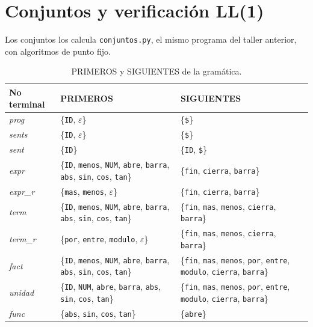 \documentclass[12pt,letterpaper]{article}
\newcommand{\tk}[1]{\texttt{#1}}
\begin{document}
\section{Conjuntos y verificación LL(1)}

Los conjuntos los calcula \tk{conjuntos.py}, el mismo programa del taller anterior, con algoritmos de punto fijo.

\begin{table}[H]
\centering
\caption{PRIMEROS y SIGUIENTES de la gramática.}
\footnotesize
\begin{tabular}{l p{5.0cm} p{5.4cm}}
\toprule
No terminal & PRIMEROS & SIGUIENTES \\
\midrule
\textit{prog} & \{\texttt{ID}, $\varepsilon$\} & \{\texttt{\$}\} \\
\textit{sents} & \{\texttt{ID}, $\varepsilon$\} & \{\texttt{\$}\} \\
\textit{sent} & \{\texttt{ID}\} & \{\texttt{ID}, \texttt{\$}\} \\
\textit{expr} & \{\texttt{ID}, \texttt{menos}, \texttt{NUM}, \texttt{abre}, \texttt{barra}, \texttt{abs}, \texttt{sin}, \texttt{cos}, \texttt{tan}\} & \{\texttt{fin}, \texttt{cierra}, \texttt{barra}\} \\
\textit{expr\_r} & \{\texttt{mas}, \texttt{menos}, $\varepsilon$\} & \{\texttt{fin}, \texttt{cierra}, \texttt{barra}\} \\
\textit{term} & \{\texttt{ID}, \texttt{menos}, \texttt{NUM}, \texttt{abre}, \texttt{barra}, \texttt{abs}, \texttt{sin}, \texttt{cos}, \texttt{tan}\} & \{\texttt{fin}, \texttt{mas}, \texttt{menos}, \texttt{cierra}, \texttt{barra}\} \\
\textit{term\_r} & \{\texttt{por}, \texttt{entre}, \texttt{modulo}, $\varepsilon$\} & \{\texttt{fin}, \texttt{mas}, \texttt{menos}, \texttt{cierra}, \texttt{barra}\} \\
\textit{fact} & \{\texttt{ID}, \texttt{menos}, \texttt{NUM}, \texttt{abre}, \texttt{barra}, \texttt{abs}, \texttt{sin}, \texttt{cos}, \texttt{tan}\} & \{\texttt{fin}, \texttt{mas}, \texttt{menos}, \texttt{por}, \texttt{entre}, \texttt{modulo}, \texttt{cierra}, \texttt{barra}\} \\
\textit{unidad} & \{\texttt{ID}, \texttt{NUM}, \texttt{abre}, \texttt{barra}, \texttt{abs}, \texttt{sin}, \texttt{cos}, \texttt{tan}\} & \{\texttt{fin}, \texttt{mas}, \texttt{menos}, \texttt{por}, \texttt{entre}, \texttt{modulo}, \texttt{cierra}, \texttt{barra}\} \\
\textit{func} & \{\texttt{abs}, \texttt{sin}, \texttt{cos}, \texttt{tan}\} & \{\texttt{abre}\} \\
\bottomrule
\end{tabular}
\end{table}
\end{document}
